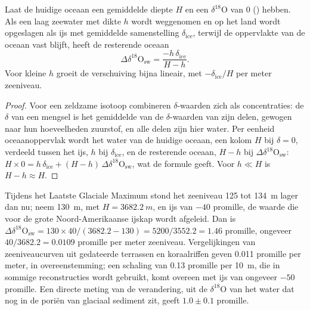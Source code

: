 \begin{proposition}\label{prop:b2:climate-proxies:mass-balance}
Laat de huidige oceaan een gemiddelde diepte $H$ en een $\delta^{18}$O van 0 () hebben. Als een laag
zeewater met dikte $h$ wordt weggenomen en op het land wordt opgeslagen als ijs met gemiddelde samenstelling
$\delta_{\mathrm{ice}}$, terwijl de oppervlakte van de oceaan vast blijft, heeft de resterende oceaan
\[
  \Delta\delta^{18}\mathrm{O}_{\mathrm{sw}} = \frac{-h\,\delta_{\mathrm{ice}}}{H - h}.
\]
Voor kleine $h$ groeit de verschuiving bijna lineair, met $-\delta_{\mathrm{ice}}/H$ per meter zeeniveau.
\end{proposition}

\begin{proof}
Voor een zeldzame isotoop combineren $\delta$-waarden zich als concentraties: de $\delta$ van een mengsel is
het gemiddelde van de $\delta$-waarden van zijn delen, gewogen naar hun hoeveelheden zuurstof, en alle
delen zijn hier water. Per eenheid oceaanoppervlak wordt het water van de huidige oceaan, een kolom $H$ bij
$\delta = 0$, verdeeld tussen het ijs, $h$ bij $\delta_{\mathrm{ice}}$, en de resterende oceaan,
$H - h$ bij $\Delta\delta^{18}\mathrm{O}_{\mathrm{sw}}$:
$H \times 0 = h\,\delta_{\mathrm{ice}} + (H - h)\,\Delta\delta^{18}\mathrm{O}_{\mathrm{sw}}$, wat
de formule geeft. Voor $h \ll H$ is $H - h \approx H$.
\end{proof}

\begin{example}\label{ex:b2:climate-proxies:lgm}
Tijdens het Laatste Glaciale Maximum stond het zeeniveau 125 tot \qty{134}{m} lager dan nu; neem \qty{130}{m},
met $H = \qty{3682.2}{m}$, en ijs van $-40$ promille, de waarde die voor de grote
Noord-Amerikaanse ijskap wordt afgeleid. Dan is
$\Delta\delta^{18}\mathrm{O}_{\mathrm{sw}} = 130 \times 40/(3682.2 - 130) = 5200/3552.2 = 1.46$
promille, ongeveer $40/3682.2 = 0.0109$ promille per meter zeeniveau. Vergelijkingen van zeeniveaucurven
uit gedateerde terrassen en koraalriffen geven \num{0.011} promille per meter, in overeenstemming; een schaling van
\num{0.13} promille per \qty{10}{m}, die in sommige reconstructies wordt gebruikt, komt overeen met ijs van ongeveer
$-50$ promille. Een directe meting van de verandering, uit de $\delta^{18}$O van het water dat nog in
de poriën van glaciaal sediment zit, geeft $1.0 \pm 0.1$ promille.
\end{example}

